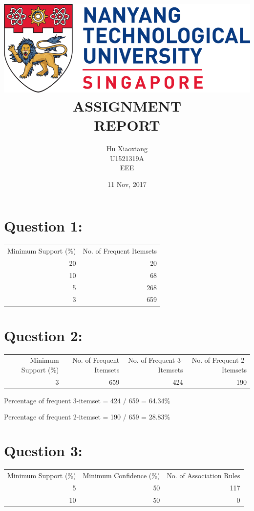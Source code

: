 \documentclass[titlepage]{article}
\author{Hu Xiaoxiang \\
U1521319A \\
EEE \\
}
\date{11 Nov, 2017 \\
}
\title{\includegraphics[width=\textwidth]{logo_ntu_new.png} \\
[5\baselineskip] ASSIGNMENT \\
REPORT \\
[5\baselineskip]}
\begin{document}
\maketitle
\tableofcontents

\newpage
{}

\section{Question 1:}
\label{sec:orgd317c5e}
\begin{center}
\begin{tabular}{rr}
\hline
Minimum Support (\%) & No. of Frequent Itemsets\\
20 & 20\\
10 & 68\\
5 & 268\\
3 & 659\\
\hline
\end{tabular}
\end{center}

\section{Question 2:}
\label{sec:org33e98e3}
\begin{center}
\begin{tabular}{rrrr}
\hline
Minimum Support (\%) & No. of Frequent Itemsets & No. of Frequent 3-Itemsets & No. of Frequent 2-Itemsets\\
3 & 659 & 424 & 190\\
\hline
\end{tabular}
\end{center}

Percentage of frequent 3-itemset = 424 / 659 = 64.34\%

Percentage of frequent 2-itemset = 190 / 659 = 28.83\%

\section{Question 3:}
\label{sec:org9a043f4}
\begin{center}
\begin{tabular}{rrr}
\hline
Minimum Support (\%) & Minimum Confidence (\%) & No. of Association Rules\\
5 & 50 & 117\\
10 & 50 & 0\\
\hline
\end{tabular}
\end{center}
\end{document}
